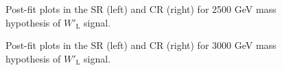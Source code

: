 \begin{figure}[H]
  \centering
  \caption{Post-fit plots in the SR (left) and CR (right) for 2500 GeV mass hypothesis of $W'_{\text{L}}$ signal.}
  \label{fig:Postfit_WpLH2500_Asimov}
\end{figure}
\begin{figure}[H]
  \centering
  \caption{Post-fit plots in the SR (left) and CR (right) for 3000 GeV mass hypothesis of $W'_{\text{L}}$ signal.}
  \label{fig:Postfit_WpLH3000_Asimov}
\end{figure}
